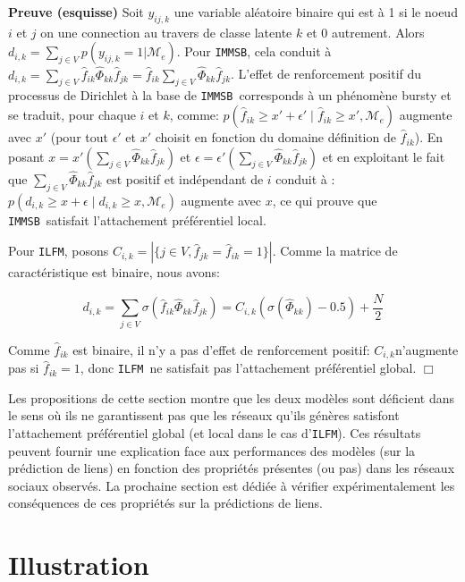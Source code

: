 \documentclass[french]{hermes-journal}
\newcommand{\ilfm}{\texttt{ILFM}}
\newcommand{\immsb}{\texttt{IMMSB}}
\newcommand{\pr}{p}
\begin{document}
\noindent \textbf{Preuve (esquisse)} Soit $y_{ij,k}$ une variable aléatoire binaire qui est à 1 si le noeud $i$ et $j$ on une connection au travers de classe latente $k$ et 0 autrement.
Alors $d_{i,k} = \sum_{j \in V} \pr(y_{ij,k} =1 | \mathcal{M}_e)$.
Pour \immsb, cela conduit à $d_{i,k} = \sum_{j \in V} \hat{f}_{ik} \hat{\Phi}_{kk} \hat{f}_{jk} = \hat{f}_{ik} \sum_{j \in V} \hat{\Phi}_{kk} \hat{f}_{jk}$.
L'effet de renforcement positif du processus de Dirichlet \cite{HDP} à la base de \immsb\ corresponds à un phénomène bursty et se traduit, pour chaque $i$ et $k$, comme: $\pr(\hat{f}_{ik} \ge x'+\epsilon' \mid \hat{f}_{ik} \ge x',\mathcal{M}_e)$ augmente avec  $x'$ (pour tout $\epsilon'$ et $x'$ choisit en fonction du domaine définition de  $\hat{f}_{ik}$).
En posant $x=x'(\sum_{j\in V} \hat{\Phi}_{kk} \hat{f}_{jk})$ et $\epsilon = \epsilon'(\sum_{j\in V} \hat{\Phi}_{kk} \hat{f}_{jk})$ et en exploitant le fait que $\sum_{j\in V} \hat{\Phi}_{kk} \hat{f}_{jk}$ est positif et indépendant de $i$ conduit à : $\pr(d_{i,k} \ge x+\epsilon \mid d_{i,k} \ge x, \mathcal{M}_e)$ augmente avec $x$, ce qui prouve que \immsb\ satisfait l'attachement préférentiel local.

Pour \ilfm, posons $C_{i,k} = |\{j \in V, \hat{f}_{jk} = \hat{f}_{ik} = 1\}|$. Comme la matrice de caractéristique est binaire, nous avons: 

\[ 
d_{i,k} = \sum_{j\in V} \sigma(\hat{f}_{ik} \hat{\Phi}_{kk} \hat{f}_{jk}) =  C_{i,k} (\sigma(\hat{\Phi}_{kk})-0.5) + \frac{N}{2}
\]

Comme $\hat{f}_{ik}$  est binaire, il n'y a pas d'effet de  renforcement positif: $C_{i,k}$n'augmente pas si $\hat{f}_{ik}=1$, donc \ilfm\ ne satisfait  pas l'attachement préférentiel global. \hspace{4.69cm} $\Box$

Les propositions de cette section montre que les deux modèles sont déficient dans le sens où ils ne garantissent pas que les réseaux qu'ils génères satisfont l'attachement préférentiel global (et local dans le cas d'\ilfm). Ces résultats peuvent fournir une explication face aux performances des modèles (sur la prédiction de liens) en fonction des propriétés présentes (ou pas) dans les réseaux sociaux observés. 
La prochaine section est dédiée à vérifier expérimentalement les conséquences de ces propriétés sur la prédictions de liens.

\section{Illustration}
\label{sec:exps}
\end{document}
